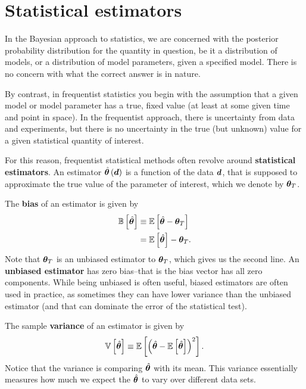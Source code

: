 \section{Statistical estimators}

In the Bayesian approach to statistics, we are concerned with the posterior probability distribution for the quantity in question, be it a distribution of models, or a distribution of model parameters, given a specified model.
There is no concern with what the correct answer is in nature.

By contrast, in frequentist statistics you begin with the assumption that a given model or model parameter has a true, fixed value (at least at some given time and point in space).
In the frequentist approach, there is uncertainty from data and experiments, but there is no uncertainty in the true (but unknown) value for a given statistical quantity of interest.

For this reason, frequentist statistical methods often revolve around \textbf{statistical estimators}.
An estimator $\hat{{\bm \theta}}\left({\bm d}\right)$ is a function of the data ${\bm d}$, that is supposed to approximate the true value of the parameter of interest, which we denote by ${\bm \theta}_T$.

The \textbf{bias} of an estimator is given by
\begin{align}
    \label{eq:estimator-bias-definition}
    \mathbb{B}\left[\hat{{\bm \theta}}\right]
    &\equiv
    \mathbb{E}\left[\hat{{\bm \theta}} - {\bm \theta}_T\right]
    \nonumber\\
    &=
    \mathbb{E}\left[\hat{{\bm \theta}}\right] - {\bm \theta}_T
    .
\end{align}
Note that ${\bm \theta}_T$ is an unbiased estimator to ${\bm \theta}_T$, which gives us the second line.
An \textbf{unbiased estimator} has zero bias--that is the bias vector has all zero components.
While being unbiased is often useful, biased estimators are often used in practice, as sometimes they can have lower variance than the unbiased estimator (and that can dominate the error of the statistical test).

The sample \textbf{variance} of an estimator is given by
\begin{align}
    \label{eq:estimator-variance-definition}
    \mathbb{V}\left[\hat{{\bm \theta}}\right]
    \equiv
    \mathbb{E}\left[\left(\hat{{\bm \theta}} - \mathbb{E}\left[\hat{{\bm \theta}}\right]\right)^2\right]
    .
\end{align}
Notice that the variance is comparing $\hat{{\bm \theta}}$ with its mean. 
This variance essentially measures how much we expect the $\hat{{\bm \theta}}$ to vary over different data sets.

